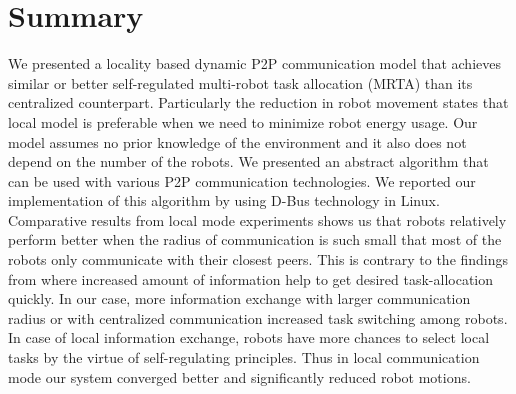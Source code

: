 \section{Summary}
\label{loacl-comm:summary}
We presented a locality based dynamic P2P communication model that achieves similar or better self-regulated multi-robot task allocation (MRTA) than its centralized counterpart. Particularly the reduction in robot movement states that local model is preferable when we need to minimize robot energy usage. Our model assumes no prior knowledge of the environment and it also does not depend on the number of the robots. We presented an abstract algorithm that can be used with various P2P communication technologies. We reported our implementation of this algorithm   by using  D-Bus technology in Linux. Comparative results from local mode experiments shows us that robots relatively perform better when the radius of communication is such small that most of the robots only communicate with their closest peers. This is contrary to the findings from \cite{Rutishauser, Epuck} where increased amount of information help to get desired task-allocation quickly. In our case, more information exchange with larger communication radius or with centralized communication increased task switching among robots. In case of local information exchange, robots have more chances to select local tasks by the virtue of self-regulating principles. Thus in local communication mode our system converged better and significantly reduced robot motions.